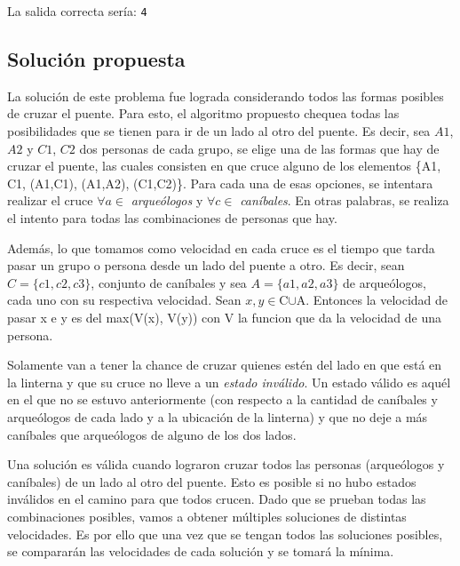         La salida correcta sería: \newline
        \texttt{4}

    \subsection{Solución propuesta}
        La solución de este problema fue lograda considerando todos las formas posibles de cruzar el puente. Para esto, el algoritmo propuesto chequea todas las posibilidades que se tienen para ir de un lado al otro del puente. Es decir, sea $A1$, $A2$ y $C1$, $C2$ dos personas de cada grupo, se elige una de las formas que hay de cruzar el puente, las cuales consisten en que cruce alguno de los elementos \{A1, C1, (A1,C1), (A1,A2), (C1,C2)\}. Para cada una de esas opciones, se intentara realizar el cruce $\forall a \in$ \emph{arqueólogos} y $\forall c \in$ \emph{caníbales}. En otras palabras, se realiza el intento para todas las combinaciones de personas que hay.

        Además, lo que tomamos como velocidad en cada cruce es el tiempo que tarda pasar un grupo o persona desde un lado del puente a otro. Es decir, sean $C =\{c1,c2,c3\}$, conjunto de caníbales y sea $A =\{a1,a2,a3\}$ de arqueólogos, cada uno con su respectiva velocidad. Sean $x,y\in$C$\cup$A. Entonces la velocidad de pasar x e y es del max(V(x), V(y)) con V la funcion que da la velocidad de una persona.

        Solamente van a tener la chance de cruzar quienes estén del lado en que está en la linterna y que su cruce no lleve a un \emph{estado inválido}. Un estado válido es aquél en el que no se estuvo anteriormente (con respecto a la cantidad de caníbales y arqueólogos de cada lado y a la ubicación de la linterna) y que no deje a más caníbales que arqueólogos de alguno de los dos lados.

        Una solución es válida cuando lograron cruzar todos las personas (arqueólogos y caníbales) de un lado al otro del puente. Esto es posible si no hubo estados inválidos en el camino para que todos crucen. Dado que se prueban todas las combinaciones posibles, vamos a obtener múltiples soluciones de distintas velocidades. Es por ello que una vez que se tengan todos las soluciones posibles, se compararán las velocidades de cada solución y se tomará la mínima.

